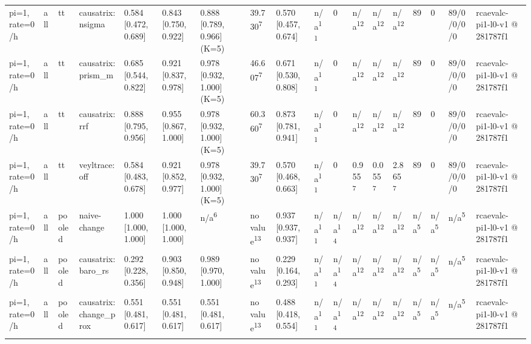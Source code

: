\begin{table}[t]
\begin{tabular}{llllllllllllllllll}
pi=1, rate=0/h & all & tt & causatrix:nsigma & 0.584 [0.472, 0.689] & 0.843 [0.750, 0.922] & 0.888 [0.789, 0.966] (K=5) & 39.730\textsuperscript{7} & 0.570 [0.457, 0.674] & n/a\textsuperscript{11} & 0 & n/a\textsuperscript{12} & n/a\textsuperscript{12} & n/a\textsuperscript{12} & 89 & 0 & 89/0/0/0/0 & rcaevalc-pi1-l0-v1 @ 281787f1 \\
pi=1, rate=0/h & all & tt & causatrix:prism\_m & 0.685 [0.544, 0.822] & 0.921 [0.837, 0.978] & 0.978 [0.932, 1.000] (K=5) & 46.607\textsuperscript{7} & 0.671 [0.530, 0.808] & n/a\textsuperscript{11} & 0 & n/a\textsuperscript{12} & n/a\textsuperscript{12} & n/a\textsuperscript{12} & 89 & 0 & 89/0/0/0/0 & rcaevalc-pi1-l0-v1 @ 281787f1 \\
pi=1, rate=0/h & all & tt & causatrix:rrf & 0.888 [0.795, 0.956] & 0.955 [0.867, 1.000] & 0.978 [0.932, 1.000] (K=5) & 60.360\textsuperscript{7} & 0.873 [0.781, 0.941] & n/a\textsuperscript{11} & 0 & n/a\textsuperscript{12} & n/a\textsuperscript{12} & n/a\textsuperscript{12} & 89 & 0 & 89/0/0/0/0 & rcaevalc-pi1-l0-v1 @ 281787f1 \\
pi=1, rate=0/h & all & tt & veyltrace:off & 0.584 [0.483, 0.678] & 0.921 [0.852, 0.977] & 0.978 [0.932, 1.000] (K=5) & 39.730\textsuperscript{7} & 0.570 [0.468, 0.663] & n/a\textsuperscript{11} & 0 & 0.955\textsuperscript{7} & 0.055\textsuperscript{7} & 2.865\textsuperscript{7} & 89 & 0 & 89/0/0/0/0 & rcaevalc-pi1-l0-v1 @ 281787f1 \\
pi=1, rate=0/h & all & pooled & naive-change & 1.000 [1.000, 1.000] & 1.000 [1.000, 1.000] & n/a\textsuperscript{6} & no value\textsuperscript{13} & 0.937 [0.937, 0.937] & n/a\textsuperscript{11} & n/a\textsuperscript{14} & n/a\textsuperscript{12} & n/a\textsuperscript{12} & n/a\textsuperscript{12} & n/a\textsuperscript{5} & n/a\textsuperscript{5} & n/a\textsuperscript{5} & rcaevalc-pi1-l0-v1 @ 281787f1 \\
pi=1, rate=0/h & all & pooled & causatrix:baro\_rs & 0.292 [0.228, 0.356] & 0.903 [0.850, 0.948] & 0.989 [0.970, 1.000] & no value\textsuperscript{13} & 0.229 [0.164, 0.293] & n/a\textsuperscript{11} & n/a\textsuperscript{14} & n/a\textsuperscript{12} & n/a\textsuperscript{12} & n/a\textsuperscript{12} & n/a\textsuperscript{5} & n/a\textsuperscript{5} & n/a\textsuperscript{5} & rcaevalc-pi1-l0-v1 @ 281787f1 \\
pi=1, rate=0/h & all & pooled & causatrix:change\_prox & 0.551 [0.481, 0.617] & 0.551 [0.481, 0.617] & 0.551 [0.481, 0.617] & no value\textsuperscript{13} & 0.488 [0.418, 0.554] & n/a\textsuperscript{11} & n/a\textsuperscript{14} & n/a\textsuperscript{12} & n/a\textsuperscript{12} & n/a\textsuperscript{12} & n/a\textsuperscript{5} & n/a\textsuperscript{5} & n/a\textsuperscript{5} & rcaevalc-pi1-l0-v1 @ 281787f1 \\

\end{tabular}
\end{table}
